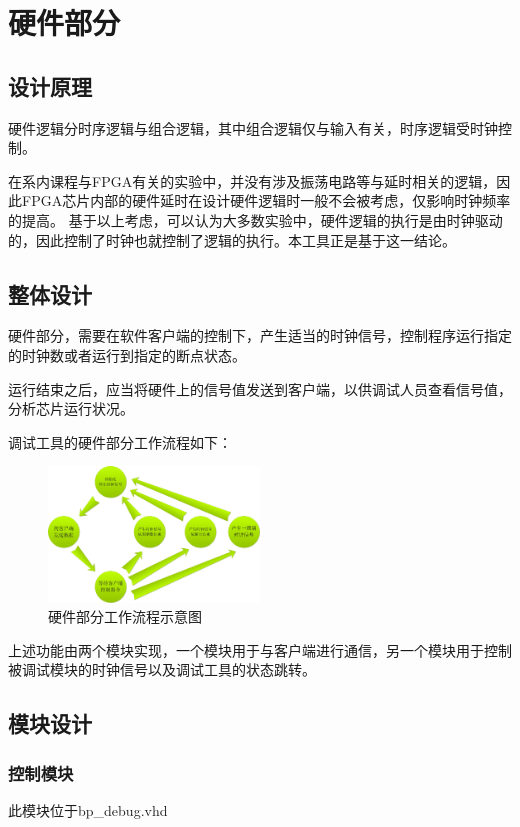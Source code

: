 \section{硬件部分}
    \subsection{设计原理}
        硬件逻辑分时序逻辑与组合逻辑，其中组合逻辑仅与输入有关，时序逻辑受时钟控制。

        在系内课程与FPGA有关的实验中，并没有涉及振荡电路等与延时相关的逻辑，因此FPGA芯片内部的硬件延时在设计硬件逻辑时一般不会被考虑，仅影响时钟频率的提高。%
        基于以上考虑，可以认为大多数实验中，硬件逻辑的执行是由时钟驱动的，因此控制了时钟也就控制了逻辑的执行。本工具正是基于这一结论。
    \subsection{整体设计}
        硬件部分，需要在软件客户端的控制下，产生适当的时钟信号，控制程序运行指定的时钟数或者运行到指定的断点状态。

        运行结束之后，应当将硬件上的信号值发送到客户端，以供调试人员查看信号值，分析芯片运行状况。

        调试工具的硬件部分工作流程如下：

        \begin{figure}[!hbp]
            \centering
            \caption{硬件部分工作流程示意图}
            \includegraphics[width=0.5\textwidth]{hardware_path.jpg}
        \end{figure}

        上述功能由两个模块实现，一个模块用于与客户端进行通信，另一个模块用于控制被调试模块的时钟信号以及调试工具的状态跳转。
    \subsection{模块设计}
        \subsubsection{控制模块}
            此模块位于bp\_debug.vhd

